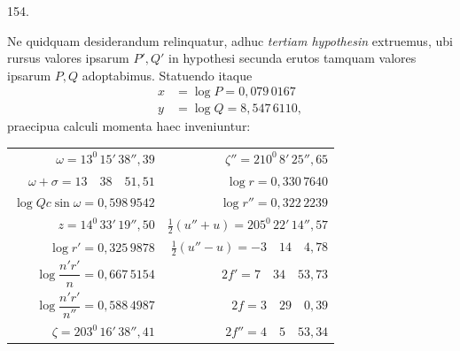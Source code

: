 \par{}\medskip
\hypertarget{native-208-article154}{}
\begin{center}154.\end{center}
Ne quidquam desiderandum relinquatur, adhuc \textit{tertiam hypothesin} extruemus, ubi rursus valores ipsarum $P',Q'$ in hypothesi secunda erutos tamquam valores ipsarum $P,Q$ adoptabimus. Statuendo itaque
\[
\begin{aligned}
x&=\log P=0{,}079\,0167\\
y&=\log Q=8{,}547\,6110,
\end{aligned}
\]
praecipua calculi momenta haec inveniuntur:
\begin{center}\small\setlength{\tabcolsep}{6pt}
\begin{tabular}{@{}r|r@{}}
$\omega=13^{0}\,15'\,38''{,}39$ & $\zeta''=210^{0}\,8'\,25''{,}65$\\[.5em]
$\omega+\sigma=13\quad38\quad51{,}51$ & $\log r=0{,}330\,7640$\\[.5em]
$\log Qc\sin\omega=0{,}598\,9542$ & $\log r''=0{,}322\,2239$\\[.5em]
$z=14^{0}\,33'\,19''{,}50$ & $\tfrac12(u''+u)=205^{0}\,22'\,14''{,}57$\\[.5em]
$\log r'=0{,}325\,9878$ & $\tfrac12(u''-u)=-3\quad14\quad4{,}78$\\[.5em]
$\log\dfrac{n'r'}{n}=0{,}667\,5154$ & $2f'=7\quad34\quad53{,}73$\\[.7em]
$\log\dfrac{n'r'}{n''}=0{,}588\,4987$ & $2f=3\quad29\quad0{,}39$\\[.7em]
$\zeta=203^{0}\,16'\,38''{,}41$ & $2f''=4\quad5\quad53{,}34$
\end{tabular}
\end{center}


